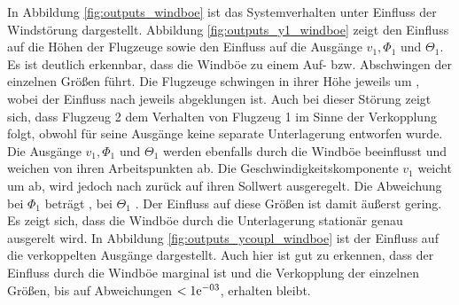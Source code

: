 In Abbildung \ref{fig:outputs_windboe} ist das Systemverhalten unter Einfluss der Windstörung dargestellt. Abbildung \ref{fig:outputs_y1_windboe} zeigt den Einfluss auf die Höhen der Flugzeuge sowie den Einfluss auf die Ausgänge $v_1, \Phi_1$ und $\Theta_1$. Es ist deutlich erkennbar, dass die Windböe zu einem Auf- bzw. Abschwingen der einzelnen Größen führt. Die Flugzeuge schwingen in ihrer Höhe jeweils um , wobei der Einfluss nach jeweils  abgeklungen ist. Auch bei dieser Störung zeigt sich, dass Flugzeug 2 dem Verhalten von Flugzeug 1 im Sinne der Verkopplung folgt, obwohl für seine Ausgänge keine separate Unterlagerung entworfen wurde. Die Ausgänge $v_1, \Phi_1$ und $\Theta_1$ werden ebenfalls durch die Windböe beeinflusst und weichen von ihren Arbeitspunkten ab. Die Geschwindigkeitskomponente $v_1$ weicht um  ab, wird jedoch nach  zurück auf ihren Sollwert ausgeregelt. Die Abweichung bei $\Phi_1$ beträgt , bei $\Theta_1$ . Der Einfluss auf diese Größen ist damit äußerst gering. Es zeigt sich, dass die Windböe durch die Unterlagerung stationär genau ausgerelt wird. In Abbildung \ref{fig:outputs_ycoupl_windboe} ist der Einfluss auf die verkoppelten Ausgänge dargestellt. Auch hier ist gut zu erkennen, dass der Einfluss durch die Windböe marginal ist und die Verkopplung der einzelnen Größen, bis auf Abweichungen $<1\mathrm{e}^{-03}$, erhalten bleibt.

